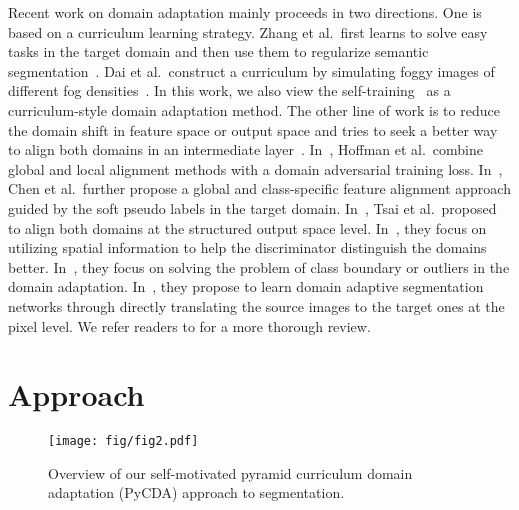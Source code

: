 \documentclass[10pt,twocolumn,letterpaper]{article}
\begin{document}
\vspace{3pt}
Recent work on domain adaptation mainly proceeds in two directions. One is based on a curriculum learning strategy. Zhang et al.\ first learns to solve easy tasks in the target domain and then use them to regularize semantic segmentation~\cite{zhang2017curriculum,curriculum_tpami}. Dai et al.\ construct a curriculum by simulating foggy images of different fog densities~\cite{dai2019curriculum}. In this work, we also view the self-training~\cite{self_motivated_2018_ECCV} as a curriculum-style domain adaptation method. The other line of work is to reduce the domain shift in feature space or output space and tries to seek a better way to align both domains in an intermediate layer~\cite{road_2018_CVPR,fcn_wild,fcan_2018_CVPR, Adaptseg_Tsai_2018_CVPR,I2I_Murez_2018_CVPR, Penalize_top_2018_ECCV, No_Discrimination_2017_ICCV, Hoffman_cycada2017, CGA_Hong_2018_CVPR, Sankaranarayanan_2018_CVPR,luo2018taking}. In~\cite{fcn_wild}, Hoffman et al.\ combine global and local alignment methods with a domain adversarial training loss. In~\cite{No_Discrimination_2017_ICCV}, Chen et al.\ further propose a global and class-specific feature alignment approach guided by the soft pseudo labels in the target domain. In~\cite{Adaptseg_Tsai_2018_CVPR}, Tsai et al.\ proposed to align both domains at the structured output space level. In~\cite{road_2018_CVPR, fcan_2018_CVPR}, they focus on utilizing spatial information to help the discriminator distinguish the domains better. In~\cite{luo2018taking, Penalize_top_2018_ECCV}, they focus on solving the problem of class boundary or outliers in the domain adaptation. In~\cite{Hoffman_cycada2017, I2I_Murez_2018_CVPR, Sankaranarayanan_2018_CVPR}, they propose to learn domain adaptive segmentation networks through directly translating the source images to the target ones at the pixel level. We refer readers to \cite[Section 5]{curriculum_tpami} for a more thorough review.



\section{Approach}\label{sec:Approach}

\begin{figure*}[]
	\centering
    \texttt{[image: fig/fig2.pdf]}
    \vspace{-1mm}
	\caption{Overview of our self-motivated pyramid curriculum domain adaptation (PyCDA) approach to segmentation.}
	\label{fig:framework}
	\vspace{-4mm}
\end{figure*}
\end{document}
